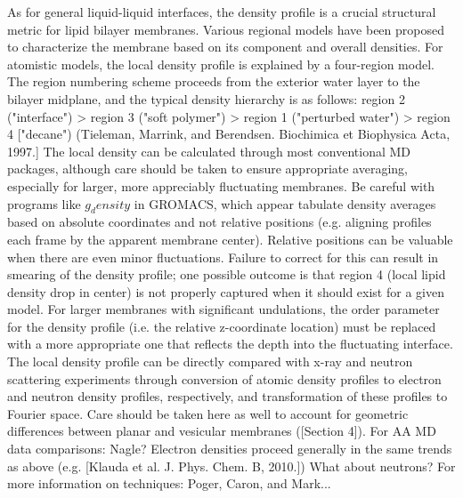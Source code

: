 \documentclass[9pt,bestpractices]{livecoms}
\begin{document}
As for general liquid-liquid interfaces, the density profile is a crucial structural metric for lipid bilayer membranes.
Various regional models have been proposed to characterize the membrane based on its component and overall densities.
For atomistic models, the local density profile is explained by a four-region model.
The region numbering scheme proceeds from the exterior water layer to the bilayer midplane, and the typical density hierarchy is as follows: region 2 ("interface") > region 3 ("soft polymer") > region 1 ("perturbed water") > region 4 ["decane") (Tieleman, Marrink, and Berendsen. Biochimica et Biophysica Acta, 1997.]
The local density can be calculated through most conventional MD packages, although care should be taken to ensure appropriate averaging, especially for larger, more appreciably fluctuating membranes.
Be careful with programs like $g_density$ in GROMACS, which appear tabulate density averages based on absolute coordinates and not relative positions (e.g. aligning profiles each frame by the apparent membrane center).
Relative positions can be valuable when there are even minor fluctuations.
Failure to correct for this can result in smearing of the density profile; one possible outcome is that region 4 (local lipid density drop in center) is not properly captured when it should exist for a given model.
For larger membranes with significant undulations, the order parameter for the density profile (i.e. the relative z-coordinate location) must be replaced with a more appropriate one that reflects the depth into the fluctuating interface.
The local density profile can be directly compared with x-ray and neutron scattering experiments through conversion of atomic density profiles to electron and neutron density profiles, respectively, and transformation of these profiles to Fourier space.
Care should be taken here as well to account for geometric differences between planar and vesicular membranes ([Section 4]).
For AA MD data comparisons: Nagle?
Electron densities proceed generally in the same trends as above (e.g. [Klauda et al. J. Phys. Chem. B, 2010.])
What about neutrons?
For more information on techniques: Poger, Caron, and Mark...
\end{document}
